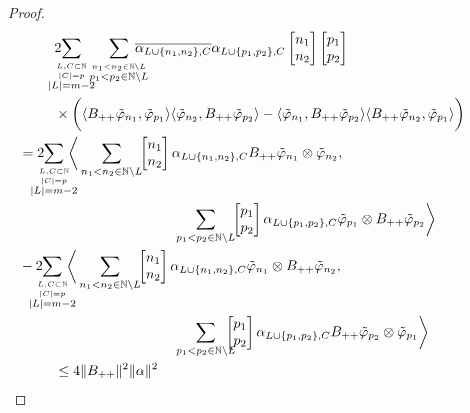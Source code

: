 \documentclass[b5paper,draft,openbib,12pt]{memoir}
\begin{document}
\begin{proof}
\begin{align}
  &2\hspace{-0.4cm}\sum_{\overset{L,C\subset \mathbb{N}}{\overset{|C|=p}{|L|=m-2}}}\hspace{-0.2cm}\sum_{\overset{n_1<n_2\in\mathbb{N}\backslash L }{p_1<p_2\in\mathbb{N}\backslash L }}
  \hspace{-0.4cm}\overline{\alpha_{L\cup\{n_1,n_2\},C}}\alpha_{L\cup\{p_1,p_2\},C}
\left[\begin{matrix}n_1\\n_2\end{matrix}\right]\left[\begin{matrix}p_1\\p_2\end{matrix}\right]\\
    &\times \bigg(
    \langle  B_{++}\tilde{\varphi}_{n_1},\tilde{\varphi}_{p_1} \rangle \langle  \tilde{\varphi}_{n_2}, B_{++}\tilde{\varphi}_{p_2}\rangle
    -\langle \tilde{\varphi}_{n_1},B_{++}\tilde{\varphi}_{p_2} \rangle \langle B_{++} \tilde{\varphi}_{n_2}, \tilde{\varphi}_{p_1}\rangle\bigg)\\
    &\hspace{-0.9cm}= 2 \!\!\!\!\!\!\!\sum_{\overset{L,C\subset \mathbb{N}}{\overset{|C|=p}{|L|=m-2}}}\!\!\!\!\!\bigg\langle \sum_{n_1<n_2\in\mathbb{N}\backslash L}
    \!\!\left[\begin{matrix}n_1\\n_2\end{matrix}\right]\alpha_{L\cup\{n_1,n_2\},C} B_{++}\tilde{\varphi}_{n_1}\otimes \tilde{\varphi}_{n_2}, \\
    &\hspace{3cm}\sum_{p_1<p_2\in\mathbb{N}\backslash L}\!\!\left[\begin{matrix}p_1\\p_2\end{matrix}\right]\alpha_{L\cup\{p_1,p_2\},C} \tilde{\varphi}_{p_1}\otimes B_{++}\tilde{\varphi}_{p_2}\bigg\rangle\\
    &\hspace{-0.9cm}-2 \!\!\!\!\!\!\!\sum_{\overset{L,C\subset \mathbb{N}}{\overset{|C|=p}{|L|=m-2}}}\!\!\!\!\!\bigg\langle \sum_{n_1<n_2\in\mathbb{N}\backslash L}
    \!\!\left[\begin{matrix}n_1\\n_2\end{matrix}\right]\alpha_{L\cup\{n_1,n_2\},C} \tilde{\varphi}_{n_1}\otimes B_{++}\tilde{\varphi}_{n_2}, \\
    &\hspace{3cm}\sum_{p_1<p_2\in\mathbb{N}\backslash L}\!\!\!\!\!\left[\begin{matrix}p_1\\p_2\end{matrix}\right]\alpha_{L\cup\{p_1,p_2\},C} B_{++}\tilde{\varphi}_{p_2}\otimes \tilde{\varphi}_{p_1}\bigg\rangle\\
    &\le 4 \|B_{++}\|^2 \|\alpha\|^2
\end{align}


\end{proof}
\end{document}

